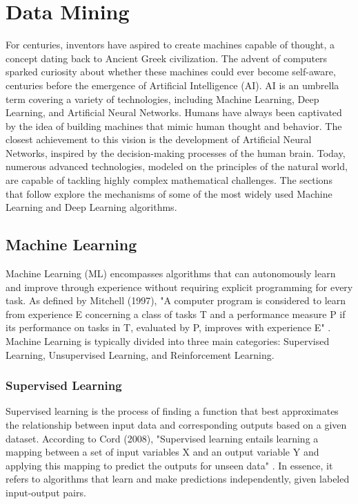 %
%
\chapter{Data Mining}
For centuries, inventors have aspired to create machines capable of thought, a concept dating back to Ancient Greek civilization. The advent of computers sparked curiosity about whether these machines could ever become self-aware, centuries before the emergence of Artificial Intelligence (AI). AI is an umbrella term covering a variety of technologies, including Machine Learning, Deep Learning, and Artificial Neural Networks. Humans have always been captivated by the idea of building machines that mimic human thought and behavior. The closest achievement to this vision is the development of Artificial Neural Networks, inspired by the decision-making processes of the human brain. Today, numerous advanced technologies, modeled on the principles of the natural world, are capable of tackling highly complex mathematical challenges. The sections that follow explore the mechanisms of some of the most widely used Machine Learning and Deep Learning algorithms.

\section{Machine Learning}
Machine Learning (ML) encompasses algorithms that can autonomously learn and improve through experience without requiring explicit programming for every task. As defined by Mitchell (1997), "A computer program is considered to learn from experience E concerning a class of tasks T and a performance measure P if its performance on tasks in T, evaluated by P, improves with experience E" \cite{Mitchell:1997}. Machine Learning is typically divided into three main categories: Supervised Learning, Unsupervised Learning, and Reinforcement Learning.

\subsection{Supervised Learning}
Supervised learning is the process of finding a function that best approximates the relationship between input data and corresponding outputs based on a given dataset. According to Cord (2008), "Supervised learning entails learning a mapping between a set of input variables X and an output variable Y and applying this mapping to predict the outputs for unseen data" \cite{Cord:2008}. In essence, it refers to algorithms that learn and make predictions independently, given labeled input-output pairs.

